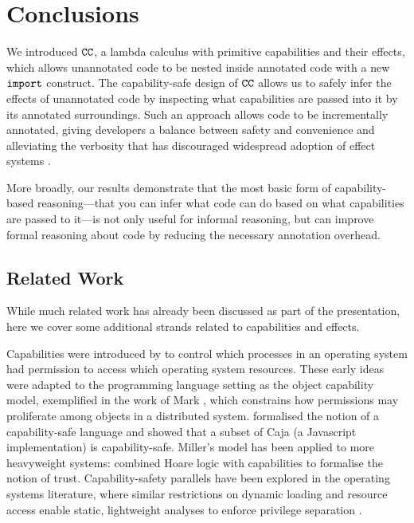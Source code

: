 \vspace{-0.6cm}
\section{Conclusions}
\vspace{-0.4cm}

We introduced $\mathtt{CC}$, a lambda calculus with primitive capabilities and their effects, which allows unannotated code to be nested inside annotated code with a new $\mathtt{import}$ construct. The capability-safe design of $\mathtt{CC}$ allows us to safely infer the effects of unannotated code by inspecting what capabilities are passed into it by its annotated surroundings. Such an approach allows code to be incrementally annotated, giving developers a balance between safety and convenience and alleviating the verbosity that has discouraged widespread adoption of effect systems \cite{rytz12}.

More broadly, our results demonstrate that the most basic form of capability-based reasoning---that you can infer what code can do based on what capabilities are passed to it---is not only useful for informal reasoning, but can improve formal reasoning about code by reducing the necessary annotation overhead.

\vspace{-0.6cm}
\subsection{Related Work}
\vspace{-0.4cm}

While much related work has already been discussed as part of the presentation, here we cover some additional strands related to capabilities and effects.

Capabilities were introduced by \cite{dennis66} to control which processes in an operating system had permission to access which operating system resources.
These early ideas were adapted to the programming language setting as the object capability model, exemplified in the work of Mark \cite{miller06}, which constrains how permissions may proliferate among objects in a distributed system.
\cite{maffeis10} formalised the notion of a capability-safe language and showed that a subset of Caja (a Javascript implementation) is capability-safe.
Miller's model has been applied to more heavyweight systems: \cite{drossopoulou07} combined Hoare logic with capabilities to formalise the notion of trust. Capability-safety parallels have been explored in the operating systems literature, where similar restrictions on dynamic loading and resource access \cite{hunt07} enable static, lightweight analyses to enforce privilege separation \cite{madhavapeddy13}.

